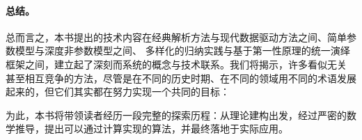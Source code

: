 \documentclass[../../book-main_zh.tex]{subfiles}
\begin{document}
\paragraph{总结。}
总而言之，本书提出的技术内容在经典解析方法与现代数据驱动方法之间、简单参数模型与深度非参数模型之间、
多样化的归纳实践与基于第一性原理的统一演绎框架之间，建立起了深刻而系统的概念与技术联系。我们将揭示，许多看似无关
甚至相互竞争的方法，尽管是在不同的历史时期、在不同的领域用不同的术语发展起来的，但它们其实都在努力实现一个共同的目标：
\begin{quote}
\end{quote}
为此，本书将带领读者经历一段完整的探索历程：从理论建构出发，经过严密的数学推导，提出可以通过计算实现的算法，并最终落地于实际应用。
\end{document}
